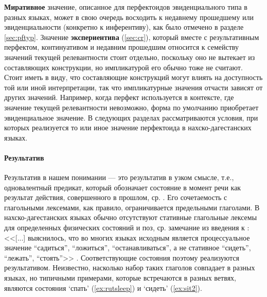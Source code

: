 \textbf{Миративное} значение, описанное для перфектоидов эвиденциального типа в разных языках, может в свою очередь восходить к недавнему прошедшему или эвиденциальности (конкретно к инферентиву), как было отмечено в разделе \ref{sec:pftyp}. Значение \textbf{экспериентива} (\ref{sec:cr}), который вместе с результативным перфектом, континуативом и недавним прошедшим относится к семейству значений текущей релевантности стоит отдельно, поскольку оно не вытекает из составляющих конструкции, но импликатурой его обычно тоже не считают. Стоит иметь в виду, что составляющие конструкций могут влиять на доступность той или иной интерпретации, так что импликатурные значения отчасти зависят от других значений. Например, когда перфект используется в контексте, где значение текущей релевантности невозможно, форма по умолчанию приобретает эвиденциальное значение. В следующих разделах рассматриваются условия, при которых реализуется то или иное значение перфектоида в нахско-дагестанских языках. 

\paragraph{Результатив} \label{sec:res}

Результатив в нашем понимании --- это результатив в узком смысле, т.е., одновалентный предикат, который обозначает состояние в момент речи как результат действия, совершенного в прошлом, ср. \citep{verhees2018}. Его сочетаемость с глагольными лексемами, как правило, ограничивается предельными глаголами. В нахско-дагестанских языках обычно отсутствуют стативные глагольные лексемы для определенных физических состояний и поз, ср. замечание из введения к \citep[8]{kiko1988}: <<[...] выяснилось, что во многих языках исходным является процессуальное значение ``садиться'', ``ложиться'', ``останавливаться'', а не стативное ``сидеть'', ``лежать'', ``стоять''>> . Соответствующие состояния поэтому реализуются результативом. Неизвестно, насколько набор таких глаголов совпадает в разных языках, но типичными примерами, которые встречаются в разных ветвях, являются состояния `спать' (\ref{ex:rutsleep}) и `сидеть' (\ref{ex:sit2}).


